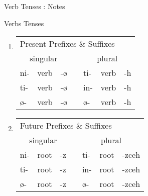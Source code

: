 \documentclass[12pt]{beamer}
\newcommand{\nah}[1]{\textcolor{nahgrn}{#1}}
\newcommand{\trs}[1]{\textcolor{nahblu}{#1}}
\begin{document}
\begin{frame}
\begin{columns}[t]
\begin{column}{.23\linewidth}
\begin{block}{Verb Tenses : Notes}
    		
    	\end{block}
    	\begin{block}{Verbs Tenses}
    		\begin{enumerate}
    			\item \begin{tabular}[t]{lllllll}
    				\multicolumn{7}{l}{Present \nah{Prefixes} \& \trs{Suffixes}}              \\
    				\multicolumn{3}{c}{singular}    & \vline & \multicolumn{3}{c}{plural}     \\
    				\cline{1-7}
    				\nah{ni-}   & verb & \trs{-ø}   & \vline & \nah{ti-}   & verb & \trs{-h}  \\
    				\nah{ti-}   & verb & \trs{-ø}   & \vline & \nah{in-}   & verb & \trs{-h}  \\
    				\nah{ø-}    & verb & \trs{-ø}   & \vline & \nah{ø-}    & verb & \trs{-h}  \\
    			\end{tabular}%
    			\item \begin{tabular}[t]{lllllll}
    				\multicolumn{7}{l}{Future \nah{Prefixes} \& \trs{Suffixes}}       	         \\
    				\multicolumn{3}{c}{singular}    & \vline & \multicolumn{3}{c}{plural}        \\
    				\cline{1-7}
    				\nah{ni-}   & root & \trs{-z}   & \vline & \nah{ti-}   & root & \trs{-zceh}  \\
    				\nah{ti-}   & root & \trs{-z}   & \vline & \nah{in-}   & root & \trs{-zceh}  \\
    				\nah{ø-}    & root & \trs{-z}   & \vline & \nah{ø-}    & root & \trs{-zceh}  \\
    			\end{tabular}%
    		\end{enumerate}
    	\end{block}
    	

\end{column}
\end{columns}
\end{frame}
\end{document}
